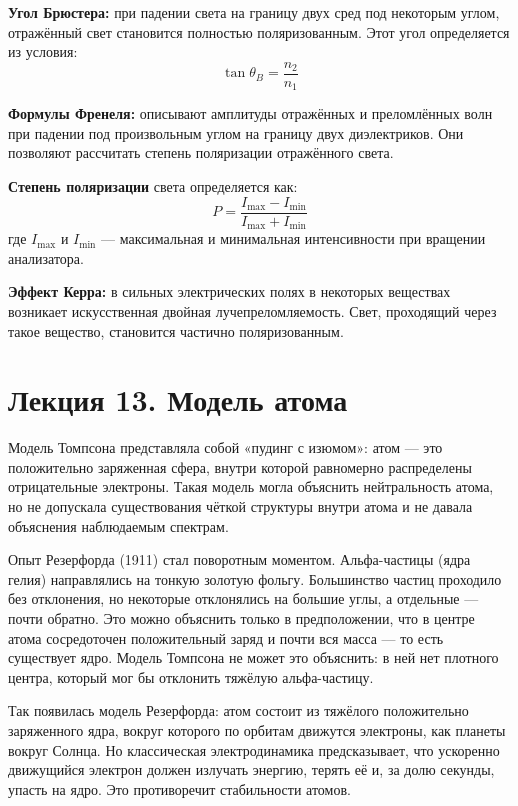\documentclass[12pt]{article}
\begin{document}
\textbf{Угол Брюстера:} при падении света на границу двух сред под некоторым углом, отражённый свет становится полностью поляризованным. Этот угол определяется из условия:
\[
\tan \theta_B = \frac{n_2}{n_1}
\]

\textbf{Формулы Френеля:} описывают амплитуды отражённых и преломлённых волн при падении под произвольным углом на границу двух диэлектриков. Они позволяют рассчитать степень поляризации отражённого света.

\textbf{Степень поляризации} света определяется как:
\[
P = \frac{I_{\max} - I_{\min}}{I_{\max} + I_{\min}}
\]
где $I_{\max}$ и $I_{\min}$ — максимальная и минимальная интенсивности при вращении анализатора.

\textbf{Эффект Керра:} в сильных электрических полях в некоторых веществах возникает искусственная двойная лучепреломляемость. Свет, проходящий через такое вещество, становится частично поляризованным.






\section{Лекция 13. Модель атома}

Модель Томпсона представляла собой «пудинг с изюмом»: атом — это положительно заряженная сфера, внутри которой равномерно распределены отрицательные электроны. Такая модель могла объяснить нейтральность атома, но не допускала существования чёткой структуры внутри атома и не давала объяснения наблюдаемым спектрам.

Опыт Резерфорда (1911) стал поворотным моментом. Альфа-частицы (ядра гелия) направлялись на тонкую золотую фольгу. Большинство частиц проходило без отклонения, но некоторые отклонялись на большие углы, а отдельные — почти обратно. Это можно объяснить только в предположении, что в центре атома сосредоточен положительный заряд и почти вся масса — то есть существует ядро. Модель Томпсона не может это объяснить: в ней нет плотного центра, который мог бы отклонить тяжёлую альфа-частицу.

Так появилась модель Резерфорда: атом состоит из тяжёлого положительно заряженного ядра, вокруг которого по орбитам движутся электроны, как планеты вокруг Солнца. Но классическая электродинамика предсказывает, что ускоренно движущийся электрон должен излучать энергию, терять её и, за долю секунды, упасть на ядро. Это противоречит стабильности атомов.
\end{document}
